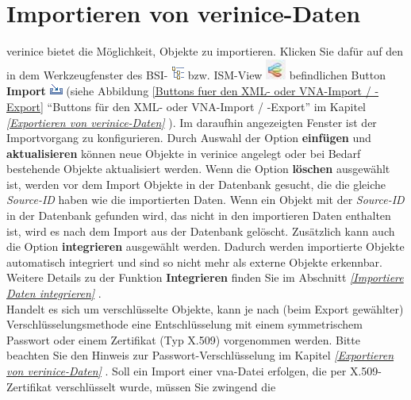 \documentclass[a4paper,10pt]{book}
\begin{document}
\section{Importieren von verinice-Daten}
verinice bietet die Möglichkeit, Objekte zu importieren. Klicken Sie dafür auf den in dem Werkzeugfenster des BSI-
\includegraphics[height=2ex]{Icon/GS_Modell.png} bzw. ISM-View \includegraphics[height=2ex]{Icon/Informationssicherheitsmodell.png}
befindlichen Button \textbf{Import} \includegraphics[height=2ex]{Icon/Import.png} (siehe Abbildung \ref{Buttons fuer den XML- oder VNA-Import / -Export} ``Buttons für den XML- oder VNA-Import / -Export''
im Kapitel {\em \ref{Exportieren von verinice-Daten} }). Im daraufhin angezeigten Fenster ist der Importvorgang zu konfigurieren. Durch Auswahl der Option
\textbf{einfügen} und \textbf{aktualisieren}  können neue Objekte in verinice angelegt oder bei Bedarf bestehende Objekte aktualisiert werden. Wenn die Option
\textbf{löschen} ausgewählt ist, werden vor dem Import Objekte in der Datenbank gesucht, die die gleiche \textit{Source-ID} haben wie die importierten Daten. Wenn ein Objekt mit der \textit{Source-ID} in der Datenbank gefunden wird, das nicht in den importieren Daten enthalten ist, wird es nach dem Import aus der Datenbank gelöscht.
Zusätzlich kann auch die Option \textbf{integrieren} ausgewählt werden. Dadurch werden importierte Objekte automatisch integriert und sind so
nicht mehr als externe Objekte erkennbar. Weitere Details zu der Funktion \textbf{Integrieren} finden Sie im Abschnitt {\em \ref{Importiere Daten integrieren} }.
\newline\\
Handelt es sich um verschlüsselte Objekte, kann je nach (beim Export gewählter) Verschlüsselungsmethode eine Entschlüsselung mit einem symmetrischem Passwort oder
einem Zertifikat (Typ X.509) vorgenommen werden. Bitte beachten Sie den Hinweis
zur Passwort-Verschlüsselung im Kapitel {\em \ref{Exportieren von
verinice-Daten} }. Soll ein Import
einer vna-Datei erfolgen, die per X.509-Zertifikat verschlüsselt wurde, müssen
Sie zwingend die
\end{document}
